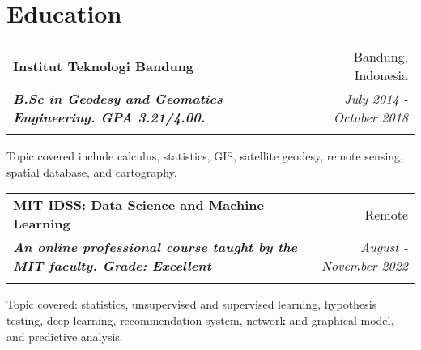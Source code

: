 \documentclass[a4paper, 11pt]{article}
\makeatletter
\newcommand{\resumeSubheading}[4]{
    \vspace{-1pt}
    \begin{tabular*}{\textwidth}{l@{\extracolsep{\fill}}r}
        \color{lightblue}\textbf{#1} & #2 \\
        \textbf{\textit{\small#3}} & \textit{\small #4} \\
        \textnormal{}\vspace{-5pt}
    \end{tabular*}\vspace{-5pt}
}
\makeatother
\begin{document}

    \vspace{20pt}
    \vspace{-5pt}
    \section{Education}
    \resumeSubheading
    {Institut Teknologi Bandung}{Bandung, Indonesia}
    {B.Sc in Geodesy and Geomatics Engineering. GPA 3.21/4.00.}{July 2014 - October 2018}
    \small{Topic covered include calculus, statistics, GIS, satellite geodesy, remote sensing, spatial database, and cartography.}

    \vspace{5pt}
    \resumeSubheading
    {MIT IDSS: Data Science and Machine Learning}{Remote}
    {An online professional course taught by the MIT faculty. Grade: Excellent}{August - November 2022}
    \small{Topic covered: statistics, unsupervised and supervised learning, hypothesis testing, 
    deep learning, recommendation system, network and graphical model, and predictive 
    analysis.}    
    
    \vspace{-10pt}
\end{document}

